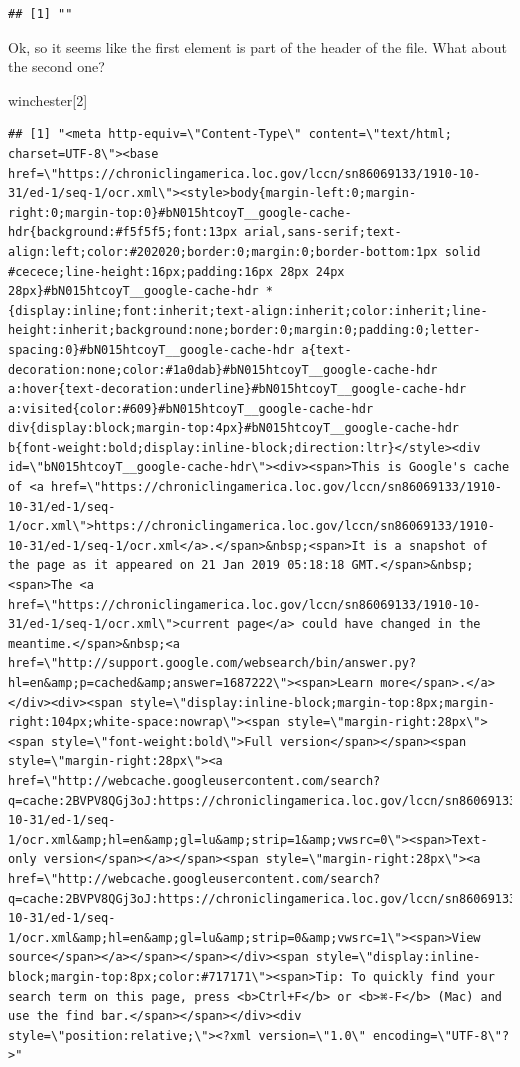 \documentclass[]{gitbook}
\newenvironment{Shaded}{\begin{snugshade}}{\end{snugshade}}
\newcommand{\DecValTok}[1]{\textcolor[rgb]{0.00,0.00,0.81}{#1}}
\newcommand{\NormalTok}[1]{#1}
\begin{document}
\begin{verbatim}
## [1] ""
\end{verbatim}

Ok, so it seems like the first element is part of the header of the file. What about the second one?

\begin{Shaded}
\begin{Highlighting}[]
\NormalTok{winchester[}\DecValTok{2}\NormalTok{]}
\end{Highlighting}
\end{Shaded}

\begin{verbatim}
## [1] "<meta http-equiv=\"Content-Type\" content=\"text/html; charset=UTF-8\"><base href=\"https://chroniclingamerica.loc.gov/lccn/sn86069133/1910-10-31/ed-1/seq-1/ocr.xml\"><style>body{margin-left:0;margin-right:0;margin-top:0}#bN015htcoyT__google-cache-hdr{background:#f5f5f5;font:13px arial,sans-serif;text-align:left;color:#202020;border:0;margin:0;border-bottom:1px solid #cecece;line-height:16px;padding:16px 28px 24px 28px}#bN015htcoyT__google-cache-hdr *{display:inline;font:inherit;text-align:inherit;color:inherit;line-height:inherit;background:none;border:0;margin:0;padding:0;letter-spacing:0}#bN015htcoyT__google-cache-hdr a{text-decoration:none;color:#1a0dab}#bN015htcoyT__google-cache-hdr a:hover{text-decoration:underline}#bN015htcoyT__google-cache-hdr a:visited{color:#609}#bN015htcoyT__google-cache-hdr div{display:block;margin-top:4px}#bN015htcoyT__google-cache-hdr b{font-weight:bold;display:inline-block;direction:ltr}</style><div id=\"bN015htcoyT__google-cache-hdr\"><div><span>This is Google's cache of <a href=\"https://chroniclingamerica.loc.gov/lccn/sn86069133/1910-10-31/ed-1/seq-1/ocr.xml\">https://chroniclingamerica.loc.gov/lccn/sn86069133/1910-10-31/ed-1/seq-1/ocr.xml</a>.</span>&nbsp;<span>It is a snapshot of the page as it appeared on 21 Jan 2019 05:18:18 GMT.</span>&nbsp;<span>The <a href=\"https://chroniclingamerica.loc.gov/lccn/sn86069133/1910-10-31/ed-1/seq-1/ocr.xml\">current page</a> could have changed in the meantime.</span>&nbsp;<a href=\"http://support.google.com/websearch/bin/answer.py?hl=en&amp;p=cached&amp;answer=1687222\"><span>Learn more</span>.</a></div><div><span style=\"display:inline-block;margin-top:8px;margin-right:104px;white-space:nowrap\"><span style=\"margin-right:28px\"><span style=\"font-weight:bold\">Full version</span></span><span style=\"margin-right:28px\"><a href=\"http://webcache.googleusercontent.com/search?q=cache:2BVPV8QGj3oJ:https://chroniclingamerica.loc.gov/lccn/sn86069133/1910-10-31/ed-1/seq-1/ocr.xml&amp;hl=en&amp;gl=lu&amp;strip=1&amp;vwsrc=0\"><span>Text-only version</span></a></span><span style=\"margin-right:28px\"><a href=\"http://webcache.googleusercontent.com/search?q=cache:2BVPV8QGj3oJ:https://chroniclingamerica.loc.gov/lccn/sn86069133/1910-10-31/ed-1/seq-1/ocr.xml&amp;hl=en&amp;gl=lu&amp;strip=0&amp;vwsrc=1\"><span>View source</span></a></span></span></div><span style=\"display:inline-block;margin-top:8px;color:#717171\"><span>Tip: To quickly find your search term on this page, press <b>Ctrl+F</b> or <b>⌘-F</b> (Mac) and use the find bar.</span></span></div><div style=\"position:relative;\"><?xml version=\"1.0\" encoding=\"UTF-8\"?>"

\end{verbatim}
\end{document}
